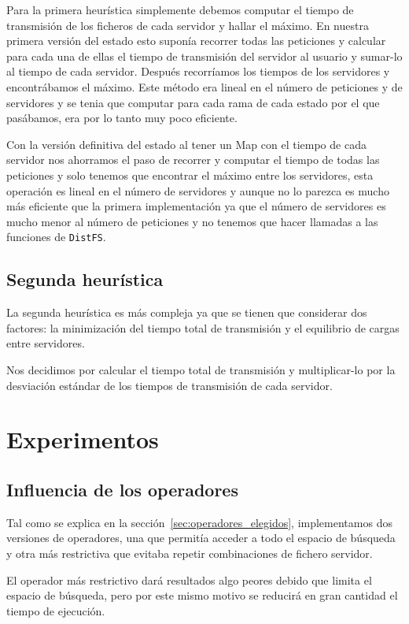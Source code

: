 Para la primera heurística simplemente debemos computar el tiempo de transmisión de los ficheros de cada servidor y hallar
el máximo. En nuestra primera versión del estado esto suponía recorrer todas las peticiones y calcular para cada una de
ellas el tiempo de transmisión del servidor al usuario y sumar-lo al tiempo de cada servidor. Después recorríamos los tiempos
de los servidores y encontrábamos el máximo. Este método era lineal en el número de peticiones y de servidores y se tenia
que computar para cada rama de cada estado por el que pasábamos, era por lo tanto muy poco eficiente.

Con la versión definitiva del estado al tener un Map con el tiempo de cada servidor nos ahorramos el paso de
recorrer y computar el tiempo de todas las peticiones y solo tenemos que encontrar el máximo entre los servidores, 
esta operación es lineal en el número de servidores y aunque no lo parezca es mucho más eficiente que la primera
implementación ya que el número de servidores es mucho menor al número de peticiones y no tenemos que hacer
llamadas a las funciones de \texttt{DistFS}.

\subsection{Segunda heurística}

La segunda heurística es más compleja ya que se tienen que considerar dos factores: la minimización del tiempo total
de transmisión y el equilibrio de cargas entre servidores.

Nos decidimos por calcular el tiempo total de transmisión y multiplicar-lo por la desviación estándar de los tiempos
de transmisión de cada servidor.

\pagebreak
\section{Experimentos}

\subsection{Influencia de los operadores}

Tal como se explica en la sección~\ref{sec:operadores_elegidos}, implementamos dos versiones de operadores,
una que permitía acceder a todo el espacio de búsqueda y otra más restrictiva que evitaba repetir combinaciones
de fichero servidor.

\begin{hyp*}
El operador más restrictivo dará resultados algo peores debido que limita el espacio de búsqueda, pero por este mismo motivo se reducirá en gran cantidad el tiempo de ejecución.
\end{hyp*}

